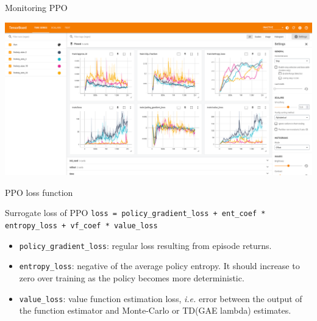 \documentclass[10pt, aspectratio=1610]{beamer}
\begin{document}
\begin{frame}{Monitoring PPO}
   \begin{adjustbox}{width=\paperwidth, height=\paperheight, keepaspectratio, center}
        \includegraphics[width=\columnwidth]{figures/tensorboard-ppo.png}
   \end{adjustbox}
\end{frame}

\begin{frame}[fragile]{PPO loss function}
    \begin{block}{Surrogate loss of PPO}
        \texttt{loss = policy_gradient_loss + ent_coef * entropy_loss + vf_coef * value_loss}
    \end{block}
    \begin{itemize}
        \item \texttt{policy_gradient_loss}: regular loss resulting from episode returns.
        \item \texttt{entropy_loss}: negative of the average policy entropy. It should increase to zero over training as the policy becomes more deterministic.
        \item \texttt{value_loss}: value function estimation loss, \emph{i.e.} error between the output of the function estimator and Monte-Carlo or TD(GAE lambda) estimates.
    \end{itemize}
\end{frame}
\end{document}
